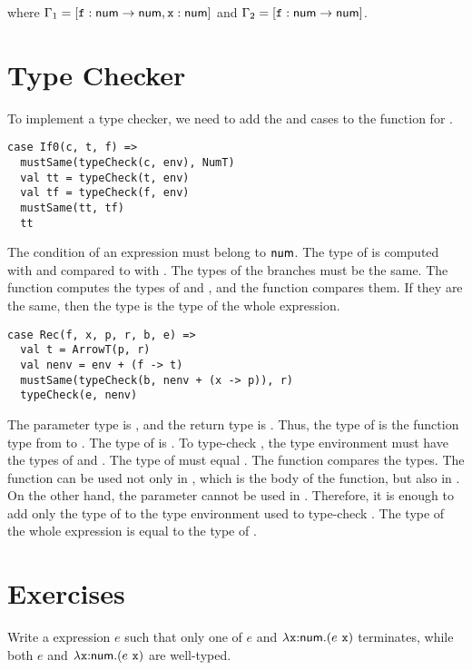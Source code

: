 where
$\Gamma_1=[\texttt{f}:\textsf{num}\rightarrow\textsf{num},\texttt{x}:\textsf{num}]$
and
$\Gamma_2=[\texttt{f}:\textsf{num}\rightarrow\textsf{num}]$.

\section{Type Checker}

To implement a type checker, we need to add the  and  cases
to the  function for \plang.

\begin{verbatim}
case If0(c, t, f) =>
  mustSame(typeCheck(c, env), NumT)
  val tt = typeCheck(t, env)
  val tf = typeCheck(f, env)
  mustSame(tt, tf)
  tt
\end{verbatim}

The condition of an expression must belong to $\textsf{num}$. The type of  is
computed with  and compared to  with .
The types of the branches must be the same. The  function
computes the types of  and , and the  function
compares them. If they are the same, then the type is the type of the whole expression.

\begin{verbatim}
case Rec(f, x, p, r, b, e) =>
  val t = ArrowT(p, r)
  val nenv = env + (f -> t)
  mustSame(typeCheck(b, nenv + (x -> p)), r)
  typeCheck(e, nenv)
\end{verbatim}

The parameter type is , and the return type is . Thus, the type
of  is the function type from  to . The type of 
is . To type-check , the type environment must have the types of
 and . The type of  must equal . The
 function compares the types. The function can be used not only in
, which is the body of the function, but also in . On the other
hand, the parameter  cannot be used in . Therefore, it is enough
to add only the type of  to the type environment used to type-check
. The type of the whole expression is equal to the type of .

\section{Exercises}

\begin{exercise}

Write a \lang expression $e$ such that only one of $e$ and
  $\lambda\texttt{x}{:}\textsf{num}.(e\ \texttt{x})$ terminates, while both $e$ and
  $\lambda\texttt{x}{:}\textsf{num}.(e\ \texttt{x})$ are well-typed.

\end{exercise}

